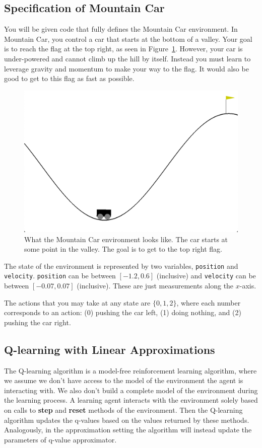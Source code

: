 \documentclass[11pt,addpoints,answers]{exam}
\begin{document}
\subsection{Specification of Mountain Car}
You will be given code that fully defines the Mountain Car environment. In Mountain Car, you control a car that starts at the bottom of a valley. Your goal is to reach the flag at the top right, as seen in Figure~\ref{fig:mountaincar}. However, your car is under-powered and cannot climb up the hill by itself. Instead you must learn to leverage gravity and momentum to make your way to the flag. It would also be good to get to this flag as fast as possible.

\begin{figure}[H]
    \centering
    \includegraphics[width=0.5\linewidth]{figs/MountainCar.png}
    \caption{What the Mountain Car environment looks like. The car starts at some point in the valley. The goal is to get to the top right flag.}
    \label{fig:mountaincar}
\end{figure}

The state of the environment is represented by two variables, \texttt{position} and \texttt{velocity}. \texttt{position} can be between $[-1.2, 0.6]$ (inclusive) and \texttt{velocity} can be between $[-0.07, 0.07]$ (inclusive). These are just measurements along the $x$-axis.

The actions that you may take at any state are $\{0, 1, 2\}$, where each number corresponds to an action: (0) pushing the car left, (1) doing nothing, and (2) pushing the car right.

\subsection{Q-learning with Linear Approximations}\label{subsec:q_learning}
The Q-learning algorithm is a model-free reinforcement learning algorithm, where we assume we don't have access to the model of the environment the agent is interacting with. We also don't build a complete model of the environment during the learning process. A learning agent interacts with the environment solely based on calls to \textbf{step} and \textbf{reset} methods of the environment. Then the Q-learning algorithm updates the q-values based on the values returned by these methods. Analogously, in the approximation setting the algorithm will instead update the parameters of q-value approximator.
\end{document}
